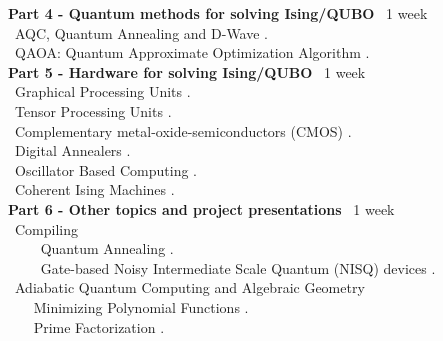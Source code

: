 \documentclass[11pt, a4paper]{article}
\begin{document}
\begin{center}
\begin{minipage}{5in}
\begin{flushleft}
{\bf Part 4 - Quantum methods for solving Ising/QUBO} \dotfill ~1 week \\
{\color{darkred}{\Rectangle}} ~AQC, Quantum Annealing and D-Wave \cite{mcgeoch2020theory,albash2018adiabatic,das2008colloquium,santoro2006optimization,farhi2001quantum,kadowaki1998quantum,johnson_quantum_2011}. \\
{\color{darkred}{\Rectangle}} ~QAOA: Quantum Approximate Optimization Algorithm \cite{farhi2014quantum,hadfield2017quantum,hadfield2019quantum}. \\


{\bf Part 5 - Hardware for solving Ising/QUBO} \dotfill ~1 week \\
{\color{darkred}{\Rectangle}} ~Graphical Processing Units \cite{yavorsky2019highly,cook2019gpu,romero2019performance}. \\
{\color{darkred}{\Rectangle}} ~Tensor Processing Units \cite{yang2019high}. \\
{\color{darkred}{\Rectangle}} ~Complementary metal-oxide-semiconductors (CMOS) \cite{yamaoka201520k}. \\
{\color{darkred}{\Rectangle}} ~Digital Annealers \cite{aramon2019physics}. \\
{\color{darkred}{\Rectangle}} ~Oscillator Based Computing \cite{chou2019analog,wang2019oim}. \\
{\color{darkred}{\Rectangle}} ~Coherent Ising Machines \cite{roques2020heuristic,inagaki2016coherent,king2018emulating,hamerly2019experimental,tiunov2019annealing,mcmahon2016fully}. \\


{\bf Part 6 - Other topics and project presentations} \dotfill ~1 week \\
{\color{darkred}{\Rectangle}} ~Compiling \\
~~~{\color{darkred}{\Rectangle}} ~Quantum Annealing \cite{bernal2019integer,dridi2018novel}. \\
~~~{\color{darkred}{\Rectangle}} ~Gate-based  Noisy Intermediate Scale Quantum (NISQ) devices \cite{dridi2019knuth}. \\
{\color{darkred}{\Rectangle}} ~Adiabatic Quantum Computing and Algebraic Geometry \\
~~~{\color{darkred}{\Rectangle}} Minimizing Polynomial Functions \cite{dridi2019minimizing}.\\
~~~{\color{darkred}{\Rectangle}} Prime Factorization \cite{dridi2017prime}.
\end{flushleft}
\end{minipage}
\end{center}
\end{document}
